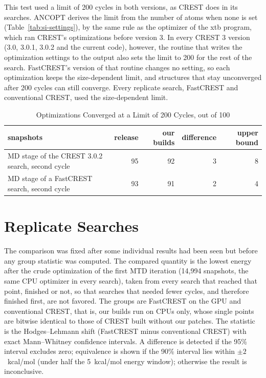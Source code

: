 \documentclass[journal=jctcce,manuscript=suppinfo]{achemso}
\begin{document}
This test used a limit of 200 cycles in both versions, as CREST does in its searches. ANCOPT derives the limit from the
number of atoms when none is set (Table~\ref{tab:si-settings}), by the same rule as the optimizer of the xtb program,
which ran CREST's optimizations before version 3. In every CREST 3 version (3.0, 3.0.1, 3.0.2 and the current code),
however, the routine that writes the optimization settings to the output also sets the limit to 200 for the rest of the
search. FastCREST's version of that routine changes no setting, so each optimization keeps the size-dependent limit, and
structures that stay unconverged after 200 cycles can still converge. Every replicate search, FastCREST and
conventional CREST, used the size-dependent limit.

\begin{table}[tbp]
\caption{Optimizations Converged at a Limit of 200 Cycles, out of 100}
\label{tab:si-cap}
\small
\begin{tabular}{@{}L{0.42\textwidth}rrrr@{}}
\toprule
snapshots & release & our builds & difference & upper bound \\
\midrule
MD stage of the CREST 3.0.2 search, second cycle & 95 & 92 & 3 & 8 \\
MD stage of a FastCREST search, second cycle & 93 & 91 & 2 & 4 \\
\bottomrule
\end{tabular}
\end{table}

\section{Replicate Searches}
\label{si:replicates}

The comparison was fixed after some individual results had been seen but before any group statistic was computed. The compared quantity is the lowest energy after the crude
optimization of the first MTD iteration (14,994 snapshots, the same CPU optimizer in every search), taken from every
search that reached that point, finished or not, so that searches that needed fewer cycles, and therefore finished first, are not favored. The groups are FastCREST on
the GPU and conventional CREST, that is, our builds run on CPUs only, whose single points are bitwise identical to
those of CREST built without our patches. The statistic is the Hodges--Lehmann shift (FastCREST minus conventional CREST) with exact Mann--Whitney
confidence intervals. A difference is detected if the 95\% interval excludes zero; equivalence is shown if the 90\%
interval lies within $\pm2$~kcal/mol (under half the 5~kcal/mol energy window); otherwise the result is inconclusive.
\end{document}

